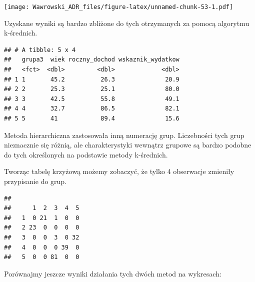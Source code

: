 \documentclass[]{book}
\newenvironment{Shaded}{\begin{snugshade}}{\end{snugshade}}
\newcommand{\DataTypeTok}[1]{\textcolor[rgb]{0.13,0.29,0.53}{#1}}
\newcommand{\KeywordTok}[1]{\textcolor[rgb]{0.13,0.29,0.53}{\textbf{#1}}}
\newcommand{\NormalTok}[1]{#1}
\newcommand{\OperatorTok}[1]{\textcolor[rgb]{0.81,0.36,0.00}{\textbf{#1}}}
\newcommand{\StringTok}[1]{\textcolor[rgb]{0.31,0.60,0.02}{#1}}
\begin{document}
\texttt{[image: Wawrowski\_ADR\_files/figure-latex/unnamed-chunk-53-1.pdf]}

Uzyskane wyniki są bardzo zbliżone do tych otrzymanych za pomocą algorytmu k-średnich.

\begin{Shaded}
\end{Shaded}

\begin{verbatim}
## # A tibble: 5 x 4
##   grupa3  wiek roczny_dochod wskaznik_wydatkow
##   <fct>  <dbl>         <dbl>             <dbl>
## 1 1       45.2          26.3              20.9
## 2 2       25.3          25.1              80.0
## 3 3       42.5          55.8              49.1
## 4 4       32.7          86.5              82.1
## 5 5       41            89.4              15.6
\end{verbatim}

Metoda hierarchiczna zastosowała inną numerację grup. Liczebności tych grup nieznacznie się różnią, ale charakterystyki wewnątrz grupowe są bardzo podobne do tych określonych na podstawie metody k-średnich.

Tworząc tabelę krzyżową możemy zobaczyć, że tylko 4 obserwacje zmieniły przypisanie do grup.

\begin{Shaded}
\end{Shaded}

\begin{verbatim}
##    
##      1  2  3  4  5
##   1  0 21  1  0  0
##   2 23  0  0  0  0
##   3  0  0  3  0 32
##   4  0  0  0 39  0
##   5  0  0 81  0  0
\end{verbatim}

Porównajmy jeszcze wyniki działania tych dwóch metod na wykresach:
\end{document}
